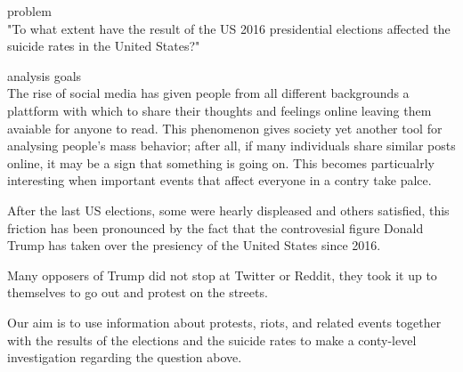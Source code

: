 {\color{red}problem}\\
"To what extent have the result of the US 2016 presidential
elections affected the suicide rates in the United States?"

{\color{red} analysis goals}\\
The rise of social media has given people from all different
backgrounds a plattform with which to share their thoughts
and feelings online leaving them avaiable for anyone to read.
This phenomenon gives society yet another tool for analysing
people's mass behavior; after all, if many individuals share
similar posts online, it may be a sign that something
is going on.
This becomes particualrly interesting
when important events that affect everyone in a contry take
palce.

After the last US elections,
some were hearly displeased and others
satisfied, this friction has been pronounced by the fact
that the controvesial figure Donald Trump has taken over
the presiency of the United States since 2016.

Many opposers of Trump did not stop at Twitter or Reddit, they
took it up to themselves to go out and protest on the streets.

Our aim is to use information about protests, riots, and
related events together with the results of the elections
and the suicide rates to make a conty-level investigation
regarding the question above.



